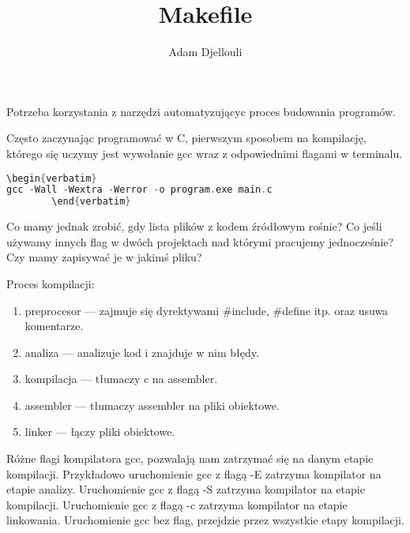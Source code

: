 \documentclass[notheorems, aspectratio=54]{beamer}
\title[Makefile]{Makefile}
\author{Adam Djellouli}
\begin{document}
\begin{frame}
	\titlepage
\end{frame}

\begin{frame}
	Potrzeba korzystania z narzędzi automatyzującyc proces budowania programów. 
	
	Często zaczynając programować w C, pierwszym sposobem na kompilację, którego się uczymy jest
	wywołanie gcc wraz z odpowiednimi flagami w terminalu.
	
	\begin{lstlisting}[language=C++]
\begin{verbatim}
gcc -Wall -Wextra -Werror -o program.exe main.c
		\end{verbatim}
	\end{lstlisting}
	
	Co mamy jednak zrobić, gdy lista plików z kodem źródłowym rośnie? Co jeśli używamy innych 
	flag w dwóch projektach nad którymi pracujemy jednocześnie? Czy mamy zapisywać je w jakimś
	pliku?
	
\end{frame}

\begin{frame}
	Proces kompilacji:
	
	\begin{enumerate}
		\item preprocesor — zajmuje się dyrektywami #include, #define itp. oraz usuwa komentarze.
		\item analiza — analizuje kod i znajduje w nim błędy.
		\item kompilacja — tłumaczy c na assembler.
		\item assembler — tłumaczy assembler na pliki obiektowe.
		\item linker — łączy pliki obiektowe.
	\end{enumerate}
	
	Różne flagi kompilatora gcc, pozwalają nam zatrzymać się na danym etapie kompilacji. Przykładowo 
	uruchomienie gcc z flagą -E zatrzyma kompilator na etapie analizy. Uruchomienie gcc z flagą -S 
	zatrzyma kompilator na etapie kompilacji. Uruchomienie gcc z flagą -c zatrzyma kompilator na
	etapie linkowania. Uruchomienie gcc bez flag, przejdzie przez wszystkie etapy kompilacji.
	
\end{frame}
\end{document}
